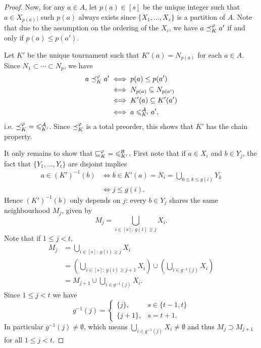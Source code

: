 \begin{proof}
    Now, for any $a \in A$, let $p(a) \in [s]$ be the unique integer such that
    $a \in X_{p(a)}$; such $p(a)$ always exists since $\{X_1,\ldots,X_s\}$ is a
    partition of $A$. Note that due to the assumption on the ordering of the
    $X_i$, we have $a \preceq_K^\varphi a'$ if and only if $p(a) \le p(a')$.

    Let $K'$ be the unique tournament such that $K'(a) = N_{p(a)}$ for each $a
    \in A$. Since $N_1 \subset \cdots \subset N_p$, we have
    \begin{equation}
        \label{tourn_eqn_ale_k_phi_iff_anle_kprime}
        \begin{aligned}
            a \preceq_K^\varphi a'
            &\iff p(a) \le p(a') \\
            &\iff N_{p(a)} \subseteq N_{p(a')} \\
            &\iff K'(a) \subseteq K'(a') \\
            &\iff a \leqslant^{\mathcal{A}}_{K'} a',
        \end{aligned}
    \end{equation}
    i.e. ${\preceq_K^\varphi} = {\leqslant^{\mathcal{A}}_{K'}}$. Since ${\preceq_K^\varphi}$ is a total
    preorder, this shows that $K'$ has the chain property.

    It only remains to show that ${\sqsubseteq_K^\varphi} = {\leqslant^{\mathcal{B}}_{K'}}$. First note
    that if $a \in X_i$ and $b \in Y_j$, the fact that $\{Y_1,\ldots,Y_t\}$ are
    disjoint implies
    \begin{align*}
        a \in (K')^{-1}(b)
        &\iff b \in K'(a) = N_i = \bigcup_{0 \le k \le g(i)}{Y_k} \\
        &\iff j \le g(i).
    \end{align*}
    Hence $(K')^{-1}(b)$ only depends on $j$: every $b \in Y_j$ shares the same
    neighbourhood $M_j$, given by
    \[
        M_j = \bigcup_{i \in [s] :\ g(i) \ge j}{X_i}.
    \]
    Note that if $1 \le j < t$,
    \begin{align*}
        M_j
        &= \bigcup_{i \in [s] :\ g(i) \ge j}{X_i} \\
        &= \left(\bigcup_{i \in [s] :\ g(i) \ge j + 1}{X_i}\right)
            \cup
            \left(\bigcup_{i \in g^{-1}(j)}{X_i}\right) \\
        &= M_{j+1} \cup \bigcup_{i \in g^{-1}(j)}{X_i}.
    \end{align*}
    Since $1 \le j < t$ we have
    \[
        g^{-1}(j) = \begin{cases}
            \{j\},& s \in \{t-1,t\} \\
            \{j+1\},& s = t + 1.
        \end{cases}
    \]
    In particular $g^{-1}(j) \ne \emptyset$, which means $\bigcup_{i \in
    g^{-1}(j)}{X_i} \ne \emptyset$ and thus $M_j \supset M_{j+1}$
    for all $1 \le j < t$.


\end{proof}
